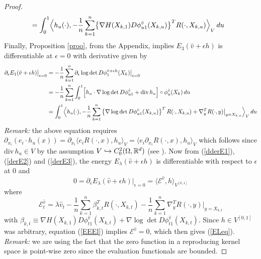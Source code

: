 \documentclass[noinfoline]{imsart}
\begin{document}
\begin{proof}
\begin{align}
&=  \int_0^1\Bigl\langle  h_u(\cdot),  -\frac{1}{n}\sum_{k=1}^n \bigl\{ \nabla H( X_{k,1}) D\phi^{\hat v}_{u1}(X_{k,u}) \bigr\}^T R(\cdot,X_{k,u})\Bigr\rangle_V \,du  \label{derE2}
\end{align}
Finally, Proposition \ref{proo}, from the Appendix, implies $E_3(\hat v+\epsilon h )$ is differentiable at $\epsilon = 0$ with derivative given by
\begin{align}
\partial_\epsilon  E_1(\hat v+\epsilon h)\bigr|_{\epsilon=0} \nonumber
&  =- \frac{1}{n} \sum_{k=1}^n  \partial_\epsilon  \log \det D\phi_{1}^{\hat v+\epsilon h }(X_k)\bigr|_{\epsilon = 0} \nonumber\\
&=- \frac{1}{n} \sum_{k=1}^n
 \int_0^1  \Bigl[ h_u \cdot \nabla \log\det D\phi_{u1}^{\hat v}  + \text{\rm div}\, h_u\Bigr] \circ  \phi^{\hat v}_{u}(X_k)  \, du \nonumber\\
&= \int_0^1 \Bigl\langle h_u(\cdot), - \frac{1}{n} \sum_{k=1}^n \left\{ \nabla \log\det D\phi_{u1}^{\hat v}(X_{k,u})\right\}^T  R(\cdot,X_{k,u})+\nabla_{y}^T R(\cdot,y)\bigr|_{y=X_{k,u}}\Bigr\rangle_V \,du \label{derE3}
\end{align}
{\em Remark:} the above equation requires $\partial_{x_i } ( e_i\cdot h_u(x))  = \partial_{x_i}   \langle e_i R(\cdot, x),  h_u\rangle_V=  \langle e_i  \partial_{x_i} R(\cdot, x),  h_u\rangle_V$ which follows since $\text{div}\, h_u \in V$ by the assumption $V\hookrightarrow C_0^2(\Omega,\Bbb R^d)$ (see \cite{aro:50}).
Now from (\ref{dderE1}),  (\ref{derE2}) and (\ref{derE3}), the energy $ E_\lambda(\hat v+\epsilon h)$ is differentiable with respect to $\epsilon$ at $0$ and
\begin{equation}
\label{EEEl}
0={\partial_\epsilon}  E_\lambda(\hat v+\epsilon h)\bigr|_{\epsilon=0}= \langle \mathcal E ^{\hat v},h \rangle_{V^{[0,1]}}
\end{equation}
where
\begin{equation}
\label{CalE}
 \mathcal E ^{\hat v}_t =\lambda \hat v_t   - \frac{1}{n}\sum_{k=1}^n \beta^T_{k,t}  R(\cdot,X_{k,t})  - \frac{1}{n}\sum_{k=1}^n \nabla_{y}^T R(\cdot,y)\bigr|_{y=X_{k,t}}
 \end{equation}
with $\beta_{k,t}\equiv  \nabla H( X_{k,1}) D\phi^{\hat v}_{t1}(X_{k,t})  + \nabla \log\det D\phi_{t1}^{\hat v}(X_{k,t}) $.
Since $h\in V^{[0,1]}$ was arbitrary, equation (\ref{EEEl}) implies $\mathcal E^{\hat v}=0$, which then gives (\ref{ELeq}). {\em Remark:} we are using the fact that the zero function in a reproducing kernel space is point-wise zero since the evaluation functionals are bounded.
\end{proof}
\end{document}
